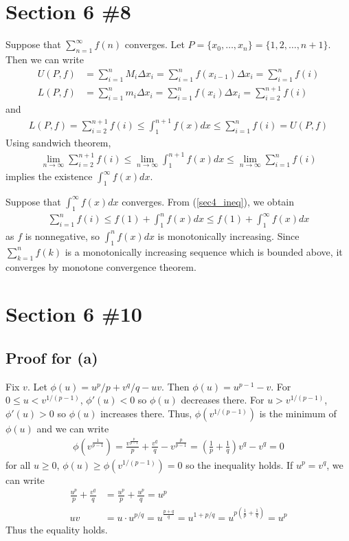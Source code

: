 \documentclass{scrartcl}
\begin{document}
\section{Section 6 \#8}
Suppose that \(\sum^\infty_{n = 1} f(n)\) converges.
Let \(P = \{x_0, \dots, x_n\} = \{1, 2, \dots, n + 1\}\).
Then we can write
\begin{align*}
  U(P, f)
  &= \sum^n_{i = 1} M_i \Delta x_i
  = \sum^n_{i = 1} f(x_{i - 1}) \Delta x_i
  = \sum^n_{i = 1} f(i) \\
  L(P, f)
  &= \sum^n_{i = 1} m_i \Delta x_i
  = \sum^n_{i = 1} f(x_i) \Delta x_i
  = \sum^{n + 1}_{i = 2} f(i)
\end{align*}
and
\begin{align}\label{sec4_ineq}
  L(P, f)
  = \sum^{n + 1}_{i = 2} f(i)
  \leq \int^{n + 1}_1 f(x) dx
  \leq \sum^n_{i = 1} f(i)
  = U(P, f)
\end{align}
Using sandwich theorem,
\begin{align*}
  \lim_{n \to \infty} \sum^{n + 1}_{i = 2} f(i)
  \leq \lim_{n \to \infty} \int^{n + 1}_1 f(x) dx
  \leq \lim_{n \to \infty} \sum^n_{i = 1} f(i)
\end{align*}
implies the existence \(\int^\infty_1 f(x) dx\).

Suppose that \(\int^\infty_1 f(x) dx\) converges.
From (\ref{sec4_ineq}), we obtain
\begin{align*}
  \sum^n_{i = 1} f(i) \leq f(1) + \int^n_1 f(x) dx \leq f(1) + \int^\infty_1 f(x) dx
\end{align*}
as \(f\) is nonnegative, so \(\int^n_1 f(x) dx\) is monotonically increasing.
Since \(\sum^n_{k = 1} f(k)\) is a monotonically increasing sequence which is bounded above, it converges by monotone convergence theorem.

\section{Section 6 \#10}
\subsection{Proof for (a)}
Fix \(v\).
Let \(\phi(u) = u^p / p + v^q / q - uv\).
Then \(\phi(u) = u^{p - 1} - v\).
For \(0 \leq u < v^{1 / (p - 1)}\), \(\phi'(u) < 0\) so \(\phi(u)\) decreases there.
For \(u > v^{1 / (p - 1)}\), \(\phi'(u) > 0\) so \(\phi(u)\) increases there.
Thus, \(\phi(v^{1 / (p - 1)})\) is the minimum of \(\phi(u)\) and we can write
\begin{align*}
  \phi(v^\frac{1}{p - 1})
  = \frac{v^\frac{p}{p - 1}}{p} + \frac{v^q}{q} - v^\frac{p}{p - 1}
  = \left( \frac{1}{p} + \frac{1}{q} \right) v^q - v^q
  = 0
\end{align*}
for all \(u \geq 0\), \(\phi(u) \geq \phi(v^{1 / (p - 1)}) = 0\) so the inequality holds.
If \(u^p = v^q\), we can write
\begin{align*}
  \frac{u^p}{p} + \frac{v^q}{q} &= \frac{u^p}{p} + \frac{u^p}{q} = u^p \\
  uv &= u \cdot u^{p / q} = u^\frac{p + q}{q} = u^{1 + p / q} = u^{p \left( \frac{1}{p} + \frac{1}{q} \right)} = u^p
\end{align*}
Thus the equality holds.
\end{document}

